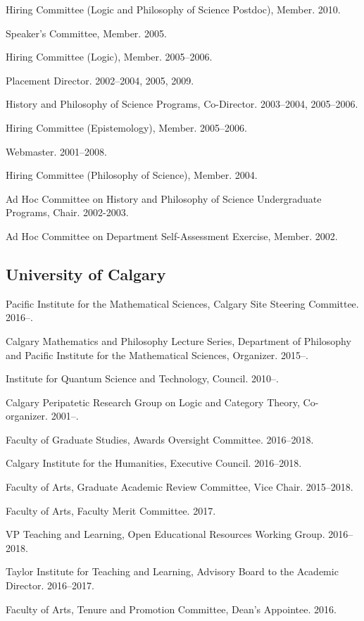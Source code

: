 \documentclass[11pt]{article}
\begin{document}
\ind Hiring Committee (Logic and Philosophy of Science Postdoc), Member. 2010.

\ind Speaker's Committee, Member. 2005.

\ind Hiring Committee (Logic), Member. 2005--2006.

\ind Placement Director. 2002--2004, 2005, 2009.

\ind History and Philosophy of Science Programs, Co-Director. 2003--2004, 2005--2006.

\ind Hiring Committee (Epistemology), Member. 2005--2006.

\ind Webmaster. 2001--2008.

\ind Hiring Committee (Philosophy of Science), Member. 2004.

\ind Ad Hoc Committee on History and Philosophy of Science Undergraduate
Programs, Chair. 2002-2003.

\ind Ad Hoc Committee on Department Self-Assessment Exercise, Member. 2002.

\subsection{University of Calgary}
\ind Pacific Institute for the Mathematical Sciences, Calgary Site Steering
Committee. 2016--.

\ind Calgary Mathematics and Philosophy Lecture Series, Department of
Philosophy and Pacific Institute for the Mathematical Sciences,
Organizer. 2015--.

\ind Institute for Quantum Science and Technology, Council. 2010--.

\ind Calgary Peripatetic Research Group on Logic and Category Theory,
Co-organizer. 2001--.

\ind Faculty of Graduate Studies, Awards Oversight Committee. 2016--2018.

\ind Calgary Institute for the Humanities, Executive Council. 2016--2018.

\ind Faculty of Arts, Graduate Academic Review Committee, Vice Chair. 2015--2018.

\ind Faculty of Arts, Faculty Merit Committee. 2017.

\ind VP Teaching and Learning, Open Educational Resources Working Group. 2016--2018.

\ind Taylor Institute for Teaching and Learning, Advisory Board to the
Academic Director. 2016--2017.

\ind Faculty of Arts, Tenure and Promotion Committee, Dean's Appointee. 2016.
\end{document}
